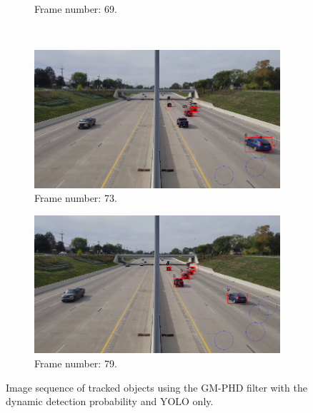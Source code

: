 \begin{figure}[H]
\begin{subfigure}{0.48\textwidth}
        \caption{Frame number: 69.}
        \label{fig:E1-V1-S1:06}
    \end{subfigure}
    \\
    \begin{subfigure}{0.48\textwidth}
        \centering
        \includegraphics[width=\linewidth]{../../../experiments/E1/V1/YOLO/73}
        \caption{Frame number: 73.}
        \label{fig:E1-V1-S1:07}
    \end{subfigure}
    \begin{subfigure}{0.48\textwidth}
        \centering
        \includegraphics[width=\linewidth]{../../../experiments/E1/V1/YOLO/79}
        \caption{Frame number: 79.}
        \label{fig:E1-V1-S1:08}
    \end{subfigure}
    \caption{Image sequence of tracked objects using the GM-PHD filter with the dynamic detection probability and YOLO
    only.}
    \label{fig:E1-V1-S1}
\end{figure}







